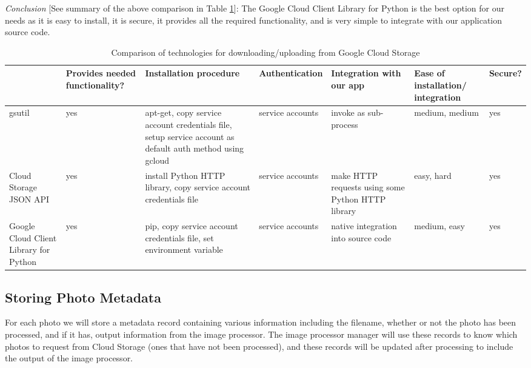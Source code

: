 \documentclass[10pt, onecolumn, draftclsnofoot, letterpaper, compsoc]{IEEEtran}
\begin{document}
\textit{Conclusion} [See summary of the above comparison in Table \ref{table:bret1}]:
The Google Cloud Client Library for Python is the best
option for our needs as it is easy to install, it is secure, it provides all the
required functionality, and is very simple to integrate with our application 
source code. \\

\begin{table}[h]
\centering
\caption{Comparison of technologies for downloading/uploading from Google Cloud Storage}
\begin{tabular}{|p{1.8cm}|p{1.4cm}|p{3cm}|p{1.8cm}|p{1.8cm}|p{1.8cm}|p{1cm}|}
\cline{4-4}
\hline

 & Provides needed functionality? & Installation procedure & Authentication 
 & Integration with our app & Ease of installation/ integration & Secure? \\ \hline

gsutil & yes & apt-get, copy service account credentials file, setup service 
account as default auth method using gcloud & service accounts & invoke as 
sub-process & medium, medium & yes \\ \hline

Cloud Storage JSON API & yes & install Python HTTP library, copy service 
account credentials file & service accounts & make HTTP requests using 
some Python HTTP library & easy, hard & yes \\ \hline

Google Cloud Client Library for Python & yes & pip, copy service account 
credentials file, set environment variable & service accounts & native 
integration into source code & medium, easy & yes \\ \hline

\end{tabular}
\label{table:bret1}
\end{table}

\subsection{Storing Photo Metadata}

For each photo we will store a metadata record containing various information 
including the filename, whether or not the photo has been processed, and if it 
has, output information from the image processor. The image processor manager
will use these records to know which photos to request from Cloud Storage 
(ones that have not been processed), and these records will be updated after 
processing to include the output of the image processor. \\
\end{document}
